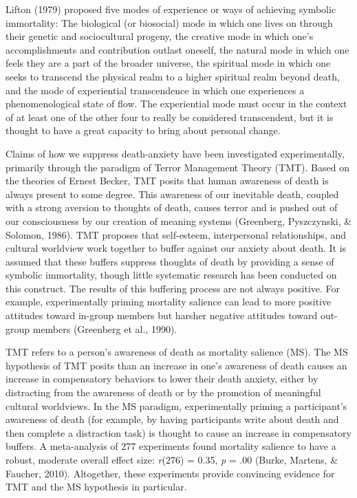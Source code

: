 \documentclass[
  man]{apa6}
\begin{document}
Lifton (1979) proposed five modes of experience or ways of achieving
symbolic immortality: The biological (or biosocial) mode in which one
lives on through their genetic and sociocultural progeny, the creative
mode in which one's accomplishments and contribution outlast oneself,
the natural mode in which one feels they are a part of the broader
universe, the spiritual mode in which one seeks to transcend the
physical realm to a higher spiritual realm beyond death, and the mode of
experiential transcendence in which one experiences a phenomenological
state of flow. The experiential mode must occur in the context of at
least one of the other four to really be considered transcendent, but it
is thought to have a great capacity to bring about personal change.

Claims of how we suppress death-anxiety have been investigated
experimentally, primarily through the paradigm of Terror Management
Theory (TMT). Based on the theories of Ernest Becker, TMT posits that
human awareness of death is always present to some degree. This
awareness of our inevitable death, coupled with a strong aversion to
thoughts of death, causes terror and is pushed out of our consciousness
by our creation of meaning systems (Greenberg, Pyszczynski, \& Solomon, 1986). TMT proposes that
self-esteem, interpersonal relationships, and cultural worldview work
together to buffer against our anxiety about death. It is assumed that
these buffers suppress thoughts of death by providing a sense of
symbolic immortality, though little systematic research has been
conducted on this construct. The results of this buffering process are
not always positive. For example, experimentally priming mortality
salience can lead to more positive attitudes toward in-group members but
harsher negative attitudes toward out-group members (Greenberg et al., 1990).

TMT refers to a person's awareness of death as mortality salience (MS).
The MS hypothesis of TMT posits than an increase in one's awareness of
death causes an increase in compensatory behaviors to lower their death
anxiety, either by distracting from the awareness of death or by the
promotion of meaningful cultural worldviews. In the MS paradigm,
experimentally priming a participant's awareness of death (for example,
by having participants write about death and then complete a distraction
task) is thought to cause an increase in compensatory buffers. A
meta-analysis of 277 experiments found mortality salience to have a
robust, moderate overall effect size: \emph{r}(276) = 0.35, \emph{p} = .00
(Burke, Martens, \& Faucher, 2010). Altogether, these experiments provide convincing evidence
for TMT and the MS hypothesis in particular.
\end{document}
